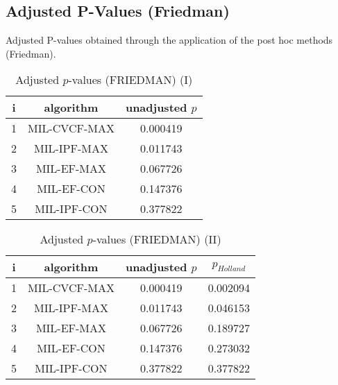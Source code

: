 \documentclass[a4paper,10pt]{article}
\begin{document}
\begin{landscape}
\newpage

\section{Adjusted P-Values (Friedman)}


Adjusted P-values obtained through the application of the post hoc methods (Friedman).

\begin{table}[!htp]
\centering\small
\begin{tabular}{ccc}
i&algorithm&unadjusted $p$\\
\hline1&MIL-CVCF-MAX&0.000419\\2&MIL-IPF-MAX&0.011743\\3&MIL-EF-MAX&0.067726\\4&MIL-EF-CON&0.147376\\5&MIL-IPF-CON&0.377822\\\hline
\end{tabular}
\caption{Adjusted $p$-values (FRIEDMAN) (I)}
\end{table}
\begin{table}[!htp]
\centering\small
\begin{tabular}{cccc}
i&algorithm&unadjusted $p$&$p_{Holland}$\\
\hline1&MIL-CVCF-MAX&0.000419&0.002094\\2&MIL-IPF-MAX&0.011743&0.046153\\3&MIL-EF-MAX&0.067726&0.189727\\4&MIL-EF-CON&0.147376&0.273032\\5&MIL-IPF-CON&0.377822&0.377822\\\hline
\end{tabular}
\caption{Adjusted $p$-values (FRIEDMAN) (II)}
\end{table}

\newpage
\end{landscape}
\end{document}
